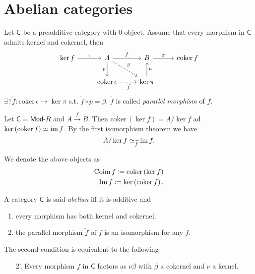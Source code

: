 \section{Abelian categories}

\begin{lem}
	Let $\mathsf{C}$ be a preadditive category with $0$ object.
	Assume that every morphism in $\mathsf{C}$ admits kernel and cokernel, then
	\begin{equation}
	\begin{tikzcd}
		\ker f \arrow[r, "\epsilon", rightarrow] & A \arrow[r, "f", rightarrow] \arrow[d, "p"', rightarrow] \arrow[rd, "\beta", dashrightarrow] &
		B \arrow[r, "\pi", rightarrow] & \mathrm{coker}\, f \\
					       & \mathrm{coker}\, \epsilon \arrow[r, "\widetilde{f}"', dashrightarrow] & \ker \pi \arrow[u, "\mu"', rightarrow] &
	\end{tikzcd}
	\end{equation} 
	$\exists\, !\, \widetilde{f}\colon \mathrm{coker}\, \epsilon \to \ker \pi$ s.t. $\widetilde{f} \circ p = \beta$.
	$\widetilde{f}$ is called {\em parallel morphism} of $f$.
\end{lem} 

\begin{ex}
	Let $\mathsf{C} = \mathsf{Mod}\text{-}R$ and $A \xrightarrow{f} B$.
	Then $\mathrm{coker}\, (\ker f) = A / \ker f$ ad $\ker \left( \mathrm{coker}\, f \right) \simeq \operatorname{im} f$.
	By the first isomorphism theorem we have
	\begin{equation}
	A/ \ker f \simeq_{\widetilde{f}} \operatorname{im} f
	.\end{equation} 
\end{ex} 

\begin{defn}
	We denote the above objects as
	\begin{align}
		\operatorname{Coim} f \coloneqq \operatorname{coker} \left( \ker f \right)\\
		\operatorname{Im} f \coloneqq \ker \left( \operatorname{coker} f \right)	
	.\end{align} 
\end{defn}

\begin{defn}
	A category $\mathsf{C}$ is said {\em abelian} iff it is additive and
	\begin{enumerate}
		\item every morphism has both kernel and cokernel,
		\item the parallel morphism $\widetilde{f}$ of $f$ is an isomorphism for any $f$.
	\end{enumerate}
	The second condition is equivalent to the following
	\begin{enumerate}
		\item[2'.] Every morphism $f$ in $\mathsf{C}$ factors as $\nu \beta$ with $\beta$ a cokernel and $\nu$ a kernel.
	\end{enumerate}
\end{defn}

